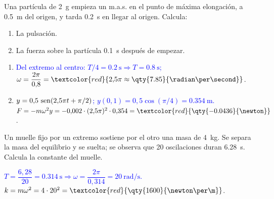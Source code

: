 \begin{exercise}
    Una partícula de \qty{2}{\g} empieza un m.a.s. en el punto de máxima elongación, a \qty{0.5}{\m} del origen, y tarda
    \qty{0.2}{\second} en llegar al origen. Calcula:
    \begin{enumerate}[label=\letraminuscula]
        \item La pulsación.
        \item La fuerza sobre la partícula \qty{0.1}{\second} después de empezar.
    \end{enumerate}
    \begin{solu}
        \begin{enumerate}[label=\letraminuscula]
            \item \textcolor{blue}{Del extremo al centro: \(T/4 = \qty{0.2}{\second} \Rightarrow T = \qty{0.8}{\second}\);} \(\omega = \dfrac{2\pi}{0{,}8} = \textcolor{red}{2{,}5\pi \approx \qty{7.85}{\radian\per\second}}\).
            \item \textcolor{blue}{\(y = 0{,}5\,\operatorname{sen}(2{,}5\pi t + \pi/2)\); \(y(0{,}1) = 0{,}5\cos(\pi/4) = \qty{0.354}{\m}\).}
            \(F = -m\omega^2 y = -0{,}002\cdot(2{,}5\pi)^2\cdot 0{,}354 = \textcolor{red}{\qty{-0.0436}{\newton}}\).
        \end{enumerate}
    \end{solu}
\end{exercise}

\begin{exercise}
    Un muelle fijo por un extremo sostiene por el otro una masa de \qty{4}{\kg}. Se separa la masa del equilibrio y se suelta;
    se observa que 20 oscilaciones duran \qty{6.28}{\second}. Calcula la constante del muelle.
    \begin{solu}
        \textcolor{blue}{\(T = \dfrac{6{,}28}{20} = \qty{0.314}{\second} \Rightarrow \omega = \dfrac{2\pi}{0{,}314} = \qty{20}{\radian\per\second}\).}
        \(k = m\omega^2 = 4\cdot 20^2 = \textcolor{red}{\qty{1600}{\newton\per\m}}\).
    \end{solu}
\end{exercise}

